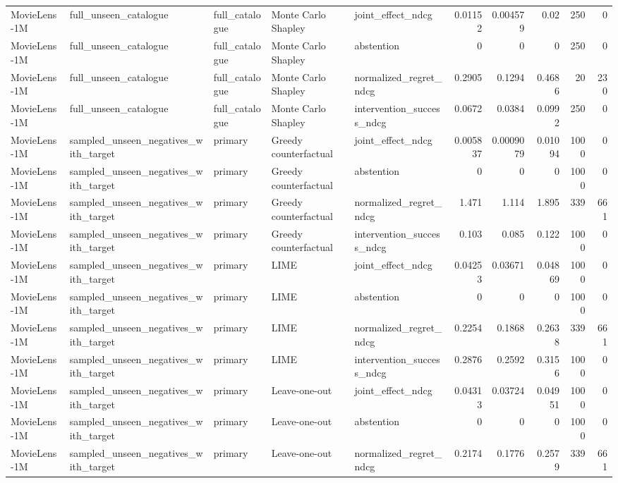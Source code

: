 \begin{table}[t]
{\begin{tabular}{lllllrrrrr}
MovieLens-1M & full\_unseen\_catalogue & full\_catalogue & Monte Carlo Shapley & joint\_effect\_ndcg & 0.01152 & 0.004579 & 0.02 & 250 & 0 \\
MovieLens-1M & full\_unseen\_catalogue & full\_catalogue & Monte Carlo Shapley & abstention & 0 & 0 & 0 & 250 & 0 \\
MovieLens-1M & full\_unseen\_catalogue & full\_catalogue & Monte Carlo Shapley & normalized\_regret\_ndcg & 0.2905 & 0.1294 & 0.4686 & 20 & 230 \\
MovieLens-1M & full\_unseen\_catalogue & full\_catalogue & Monte Carlo Shapley & intervention\_success\_ndcg & 0.0672 & 0.0384 & 0.0992 & 250 & 0 \\
MovieLens-1M & sampled\_unseen\_negatives\_with\_target & primary & Greedy counterfactual & joint\_effect\_ndcg & 0.005837 & 0.0009079 & 0.01094 & 1000 & 0 \\
MovieLens-1M & sampled\_unseen\_negatives\_with\_target & primary & Greedy counterfactual & abstention & 0 & 0 & 0 & 1000 & 0 \\
MovieLens-1M & sampled\_unseen\_negatives\_with\_target & primary & Greedy counterfactual & normalized\_regret\_ndcg & 1.471 & 1.114 & 1.895 & 339 & 661 \\
MovieLens-1M & sampled\_unseen\_negatives\_with\_target & primary & Greedy counterfactual & intervention\_success\_ndcg & 0.103 & 0.085 & 0.122 & 1000 & 0 \\
MovieLens-1M & sampled\_unseen\_negatives\_with\_target & primary & LIME & joint\_effect\_ndcg & 0.04253 & 0.03671 & 0.04869 & 1000 & 0 \\
MovieLens-1M & sampled\_unseen\_negatives\_with\_target & primary & LIME & abstention & 0 & 0 & 0 & 1000 & 0 \\
MovieLens-1M & sampled\_unseen\_negatives\_with\_target & primary & LIME & normalized\_regret\_ndcg & 0.2254 & 0.1868 & 0.2638 & 339 & 661 \\
MovieLens-1M & sampled\_unseen\_negatives\_with\_target & primary & LIME & intervention\_success\_ndcg & 0.2876 & 0.2592 & 0.3156 & 1000 & 0 \\
MovieLens-1M & sampled\_unseen\_negatives\_with\_target & primary & Leave-one-out & joint\_effect\_ndcg & 0.04313 & 0.03724 & 0.04951 & 1000 & 0 \\
MovieLens-1M & sampled\_unseen\_negatives\_with\_target & primary & Leave-one-out & abstention & 0 & 0 & 0 & 1000 & 0 \\
MovieLens-1M & sampled\_unseen\_negatives\_with\_target & primary & Leave-one-out & normalized\_regret\_ndcg & 0.2174 & 0.1776 & 0.2579 & 339 & 661 \\

\end{tabular}}
\end{table}
